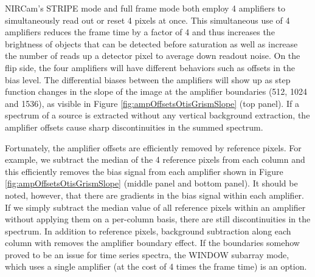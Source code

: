 \documentclass{aastex62}
\begin{document}
NIRCam's STRIPE mode and full frame mode both employ 4 amplifiers to simultaneously read out or reset 4 pixels at once.
This simultaneous use of 4 amplifiers reduces the frame time by a factor of 4 and thus increases the brightness of objects that can be detected before saturation as well as increase the number of reads up a detector pixel to average down readout noise.
On the flip side, the four amplifiers will have different behaviors such as offsets in the bias level.
The differential biases between the amplifiers will show up as step function changes in the slope of the image at the amplifier boundaries (512, 1024 and 1536), as visible in Figure \ref{fig:ampOffsetsOtisGrismSlope} (top panel).
If a spectrum of a source is extracted without any vertical background extraction, the amplifier offsets cause sharp discontinuities in the summed spectrum.

Fortunately, the amplifier offsets are efficiently removed by reference pixels.
For example, we subtract the median of the 4 reference pixels from each column and this efficiently removes the bias signal from each amplifier shown in Figure \ref{fig:ampOffsetsOtisGrismSlope} (middle panel and bottom panel).
It should be noted, however, that there are gradients in the bias signal within each amplifier. If we simply subtract the median value of all reference pixels within an amplifier without applying them on a per-column basis, there are still discontinuities in the spectrum.
In addition to reference pixels, background subtraction along each column with removes the amplifier boundary effect.
If the boundaries somehow proved to be an issue for time series spectra, the WINDOW subarray mode, which uses a single amplifier (at the cost of 4 times the frame time) is an option.
\end{document}
